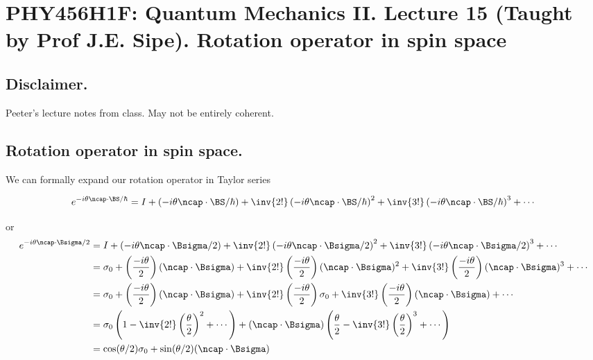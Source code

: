 
%

\chapter{PHY456H1F: Quantum Mechanics II.  Lecture 15 (Taught by Prof J.E. Sipe).  Rotation operator in spin space}
\label{chap:qmTwoL15}
{}
\date{Oct 31, 2011}

\beginArtWithToc

\section{Disclaimer.}

Peeter's lecture notes from class.  May not be entirely coherent.

\section{Rotation operator in spin space.}

We can formally expand our rotation operator in Taylor series

\begin{equation}\label{eqn:qmTwoL15:10}
e^{-i \theta \ncap \cdot \BS/\hbar}
= 
I 
+
\left(-i \theta \ncap \cdot \BS/\hbar\right)
+
\inv{2!}
\left(-i \theta \ncap \cdot \BS/\hbar\right)^2
+
\inv{3!}
\left(-i \theta \ncap \cdot \BS/\hbar\right)^3
+ \cdots
\end{equation}

or
\begin{align*}
e^{-i \theta \ncap \cdot \Bsigma/2}
&= 
I 
+
\left(-i \theta \ncap \cdot \Bsigma/2\right)
+
\inv{2!}
\left(-i \theta \ncap \cdot \Bsigma/2\right)^2
+
\inv{3!}
\left(-i \theta \ncap \cdot \Bsigma/2\right)^3
+ \cdots \\
&=
\sigma_0 
+
\left(\frac{-i \theta}{2}\right) (\ncap \cdot \Bsigma)
+
\inv{2!} \left(\frac{-i \theta}{2}\right) (\ncap \cdot \Bsigma)^2
+
\inv{3!} \left(\frac{-i \theta}{2}\right) (\ncap \cdot \Bsigma)^3
+ \cdots \\
&=
\sigma_0 
+
\left(\frac{-i \theta}{2}\right) (\ncap \cdot \Bsigma)
+
\inv{2!} \left(\frac{-i \theta}{2}\right) \sigma_0
+
\inv{3!} \left(\frac{-i \theta}{2}\right) (\ncap \cdot \Bsigma) 
+ \cdots \\
&=
\sigma_0 \left( 1 - \inv{2!}\left(\frac{\theta}{2}\right)^2 + \cdots \right) 
+
(\ncap \cdot \Bsigma) \left( \frac{\theta}{2} - \inv{3!}\left(\frac{\theta}{2}\right)^3 + \cdots \right) \\
&=
\cos(\theta/2) \sigma_0 + \sin(\theta/2) (\ncap \cdot \Bsigma)
\end{align*}

